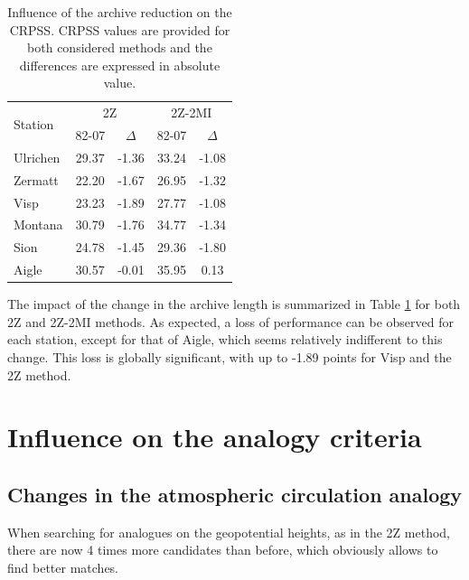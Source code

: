\documentclass[hess]{copernicus}
\begin{document}
\begin{table}[htb]
	\caption{Influence of the archive reduction on the CRPSS. CRPSS values are provided for both considered methods and the differences are expressed in absolute value.}
	\begin{center}
		\begin{tabular}{l c c c c }
			\hline
			\multirow{2}{*}{Station} & \multicolumn{2}{c}{2Z} & \multicolumn{2}{c}{2Z-2MI} \\
			& 82-07 & $\Delta$ & 82-07 & $\Delta$ \\ 
			\hline
			Ulrichen & 29.37 & -1.36 & 33.24 & -1.08 \\
			Zermatt & 22.20 & -1.67 & 26.95 & -1.32 \\
			Visp & 23.23 & -1.89 & 27.77 & -1.08 \\
			Montana & 30.79 & -1.76 & 34.77 & -1.34 \\
			Sion & 24.78 & -1.45 & 29.36 & -1.80 \\
			Aigle & 30.57 & -0.01 & 35.95 & 0.13 \\ 
			\hline
		\end{tabular}
	\end{center}
	\label{table:loss_reduction}
\end{table}

The impact of the change in the archive length is summarized in Table \ref{table:loss_reduction} for both 2Z and 2Z-2MI methods. As expected, a loss of performance can be observed for each station, except for that of Aigle, which seems relatively indifferent to this change. This loss is globally significant, with up to -1.89 points for Visp and the 2Z method. 


\section{Influence on the analogy criteria}
\label{sec:influence_criteria}

\subsection{Changes in the atmospheric circulation analogy}

When searching for analogues on the geopotential heights, as in the 2Z method, there are now 4 times more candidates than before, which obviously allows to find better matches.
\end{document}
